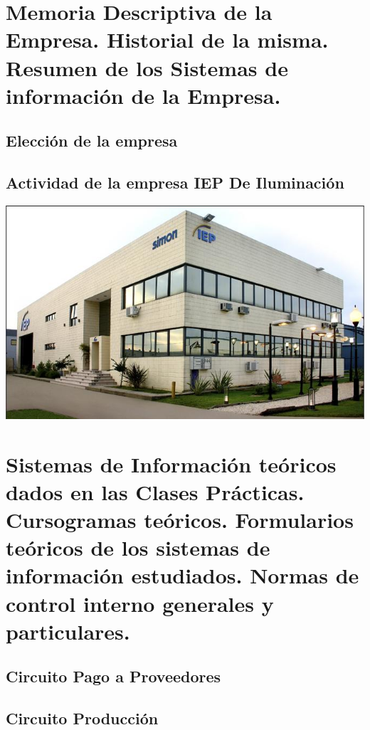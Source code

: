 \documentclass[12pt,titlepage]{report}
\begin{document}
\part{Memoria Descriptiva de la Empresa. Historial de la misma. Resumen de los Sistemas de
información de la Empresa.}

\chapter{Elección de la empresa}

\chapter{Actividad de la empresa IEP De Iluminación}
\begin{center}
 \includegraphics[scale=0.75]{./Images/iep-instalacion.png}
\end{center}


\part{Sistemas de Información teóricos dados en las Clases Prácticas. Cursogramas teóricos.
Formularios teóricos de los sistemas de información estudiados. Normas de control interno
generales y particulares.}

\chapter{Circuito Pago a Proveedores}

\chapter{Circuito Producci\'on}

\end{document}
